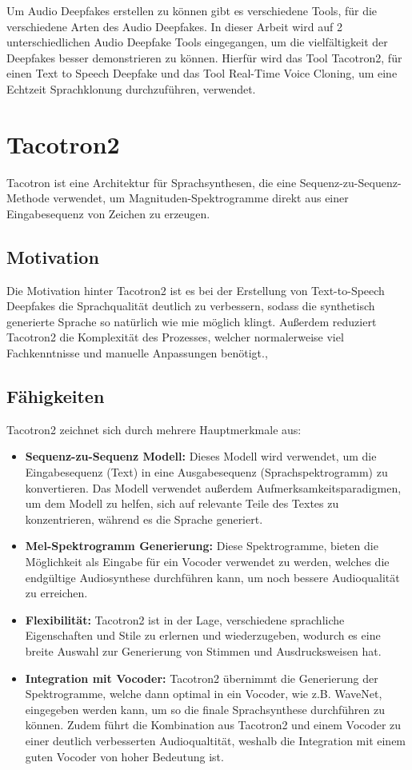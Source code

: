 Um Audio Deepfakes erstellen zu können gibt es verschiedene Tools, für die verschiedene Arten des Audio Deepfakes.
In dieser Arbeit wird auf 2 unterschiedlichen Audio Deepfake Tools eingegangen, um die vielfältigkeit der Deepfakes besser demonstrieren zu können.
Hierfür wird das Tool Tacotron2, für einen Text to Speech Deepfake und das Tool Real-Time Voice Cloning, um eine Echtzeit Sprachklonung durchzuführen, verwendet.

\section{Tacotron2}
Tacotron ist eine Architektur für Sprachsynthesen, die eine \gls{Sequenz-zu-Sequenz-Methode} verwendet, um \gls{Magnituden-Spektrogramme} direkt aus einer Eingabesequenz von Zeichen zu erzeugen.

\subsection{Motivation}
Die Motivation hinter Tacotron2 ist es bei der Erstellung von Text-to-Speech Deepfakes die Sprachqualität deutlich zu verbessern, sodass die synthetisch generierte Sprache so natürlich wie mie möglich klingt.
Außerdem reduziert Tacotron2 die Komplexität des Prozesses, welcher normalerweise viel Fachkenntnisse und manuelle Anpassungen benötigt.\cite{Arxiv},\cite{Arxiv2}

\subsection{Fähigkeiten}
Tacotron2 zeichnet sich durch mehrere Hauptmerkmale aus:
\begin{itemize}
    \item \textbf{Sequenz-zu-Sequenz Modell:} Dieses Modell wird verwendet, um die Eingabesequenz (Text) in eine Ausgabesequenz (Sprachspektrogramm) zu konvertieren. Das Modell verwendet außerdem Aufmerksamkeitsparadigmen, um dem Modell zu helfen, sich auf relevante Teile des Textes zu konzentrieren, während es die Sprache generiert.\cite{Arxiv2}
    \item \textbf{Mel-Spektrogramm Generierung:} Diese Spektrogramme, bieten die Möglichkeit als Eingabe für ein Vocoder verwendet zu werden, welches die endgültige Audiosynthese durchführen kann, um noch bessere Audioqualität zu erreichen.\cite{Arxiv}
    \item \textbf{Flexibilität:} Tacotron2 ist in der Lage, verschiedene sprachliche Eigenschaften und Stile zu erlernen und wiederzugeben, wodurch es eine breite Auswahl zur Generierung von Stimmen und Ausdrucksweisen hat.\cite{Arxiv}
    \item \textbf{Integration mit Vocoder:} Tacotron2 übernimmt die Generierung der Spektrogramme, welche dann optimal in ein Vocoder, wie z.B. WaveNet, eingegeben werden kann, um so die finale Sprachsynthese durchführen zu können. Zudem führt die Kombination aus Tacotron2 und einem Vocoder zu einer deutlich verbesserten Audioqualtität, weshalb die Integration mit einem guten Vocoder von hoher Bedeutung ist. \cite{Arxiv}
\end{itemize}

